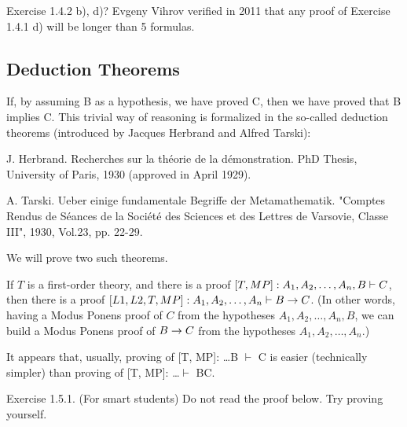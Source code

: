 \begin{exercise}
Exercise 1.4.2 b), d)? Evgeny Vihrov verified in 2011 that any proof of Exercise 1.4.1 d) will be longer than 5 formulas.
\end{exercise}

\subsection{Deduction Theorems}

If, by assuming B as a hypothesis, we have proved C, then we have proved that B implies C. This trivial way of reasoning is formalized in the so-called deduction theorems (introduced by Jacques Herbrand and Alfred Tarski):

J. Herbrand. Recherches sur la th\'{e}orie de la d\'{e}monstration. PhD Thesis, University of Paris, 1930 (approved in April 1929).

A. Tarski. Ueber einige fundamentale Begriffe der Metamathematik. "Comptes Rendus de Séances de la Société des Sciences et des Lettres de Varsovie, Classe III", 1930, Vol.23, pp. 22-29.

We will prove two such theorems.

\begin{theorem}
If \(T\) is a first-order theory, and there is a proof \([T, MP]: A_1,A_2,\ldots,A_n,B\vdash C\), then there is a proof \([L1, L2, T, MP]: A_1,A_2,\ldots,A_n\vdash B\rightarrow C\).
(In other words, having a Modus Ponens proof of \(C\) from the hypotheses \(A_1,A_2,\ldots,A_n,B\), we can build a Modus Ponens proof of \(B\rightarrow C\) from the hypotheses \(A_1,A_2,\ldots,A_n\).)
\end{theorem}

It appears that, usually, proving of [T, MP]: \ldots  B \(\vdash\) C is easier (technically simpler) than proving of [T, MP]: \ldots  \(\vdash\) B\IMPLIES C.

\begin{exercise}[\(*\)]
Exercise 1.5.1. (For smart students) Do not read the proof below. Try proving yourself.
\end{exercise}

